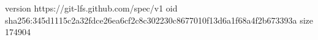 version https://git-lfs.github.com/spec/v1
oid sha256:345d1115c2a32fdce26ea6cf2c8c302230c8677010f13d6a1f68a4f2b673393a
size 174904
